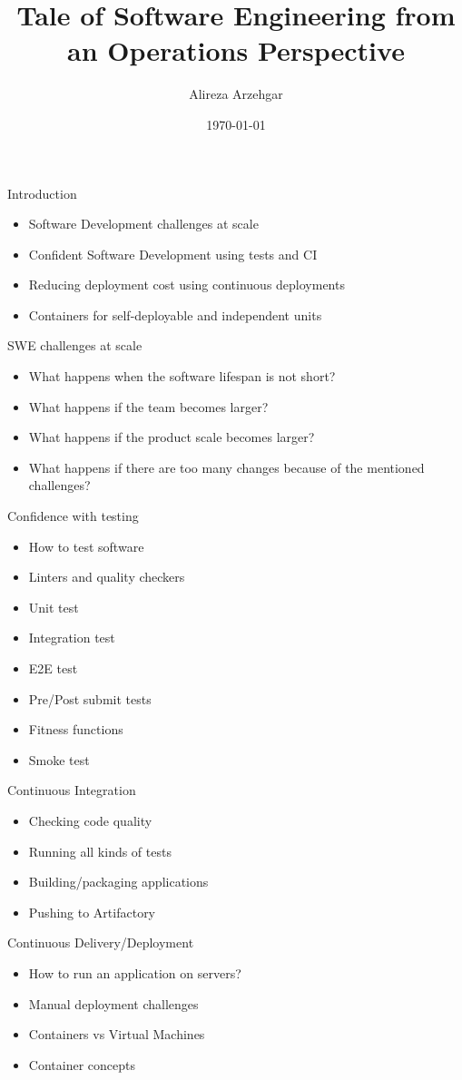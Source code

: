 \documentclass[xcolor={rgb}]{beamer}
\author{Alireza Arzehgar}
\title{Tale of Software Engineering from an Operations Perspective}
\date{\today}
\newcommand{\pitem}{\pause\item}
\begin{document}
	\begin{frame}[plain]
		\titlepage
	\end{frame}

	\begin{frame}{Introduction}
	\begin{itemize}
		\pitem Software Development challenges at scale
		\pitem Confident Software Development using tests and CI
		\pitem Reducing deployment cost using continuous deployments
		\pitem Containers for self-deployable and independent units 
	\end{itemize}
	\end{frame}

	\begin{frame}{SWE challenges at scale}
	\begin{itemize}
		\pitem What happens when the software lifespan is not short?
		\pitem What happens if the team becomes larger?
		\pitem What happens if the product scale becomes larger?
		\pitem What happens if there are too many changes because of the mentioned challenges?
	\end{itemize}
	\end{frame}
	
	\begin{frame}{Confidence with testing}
	\begin{itemize}
		\pitem How to test software
		\pitem Linters and quality checkers
		\pitem Unit test
		\pitem Integration test
		\pitem E2E test
		\pitem Pre/Post submit tests
		\pitem Fitness functions
		\pitem Smoke test
	\end{itemize}
	\end{frame}
	
	\begin{frame}{Continuous Integration}
	\begin{itemize}
		\pitem Checking code quality
		\pitem Running all kinds of tests
		\pitem Building/packaging applications
		\pitem Pushing to Artifactory
	\end{itemize}
	\end{frame}

	\begin{frame}{Continuous Delivery/Deployment}
	\begin{itemize}
		\pitem How to run an application on servers?
		\pitem Manual deployment challenges
		\pitem Containers vs Virtual Machines
		\pitem Container concepts
	\end{itemize}
	\end{frame}
\end{document}
